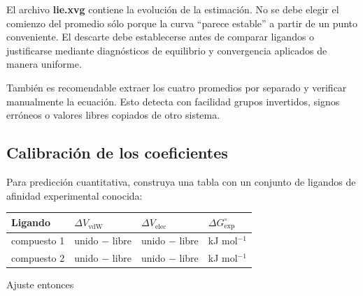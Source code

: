 \documentclass[
  spanish,
  11pt,
  a4paper]{article}
\newcounter{none} %
\begin{document}
El archivo \textbf{lie.xvg} contiene la evolución de la estimación. No
se debe elegir el comienzo del promedio sólo porque la curva ``parece
estable'' a partir de un punto conveniente. El descarte debe
establecerse antes de comparar ligandos o justificarse mediante
diagnósticos de equilibrio y convergencia aplicados de manera uniforme.

También es recomendable extraer los cuatro promedios por separado y
verificar manualmente la ecuación. Esto detecta con facilidad grupos
invertidos, signos erróneos o valores libres copiados de otro sistema.

\subsection{Calibración de los
coeficientes}\label{calibraciuxf3n-de-los-coeficientes}

Para predicción cuantitativa, construya una tabla con un conjunto de
ligandos de afinidad experimental conocida:

{\def\LTcaptype{none} %
\begin{longtable}[]{@{}
  >{\raggedright\arraybackslash}p{}
  >{\raggedleft\arraybackslash}p{}
  >{\raggedleft\arraybackslash}p{}
  >{\raggedleft\arraybackslash}p{}@{}}
\toprule\noalign{}
\begin{minipage}[b]{\linewidth}\raggedright
Ligando
\end{minipage} & \begin{minipage}[b]{\linewidth}\raggedleft
\(\Delta V_{\mathrm{vdW}}\)
\end{minipage} & \begin{minipage}[b]{\linewidth}\raggedleft
\(\Delta V_{\mathrm{elec}}\)
\end{minipage} & \begin{minipage}[b]{\linewidth}\raggedleft
\(\Delta G^\circ_{\mathrm{exp}}\)
\end{minipage} \\
\midrule\noalign{}
\endhead
\bottomrule\noalign{}
\endlastfoot
compuesto 1 & unido − libre & unido − libre & kJ mol\(^{-1}\) \\
compuesto 2 & unido − libre & unido − libre & kJ mol\(^{-1}\) \\
\end{longtable}
}

Ajuste entonces
\end{document}
